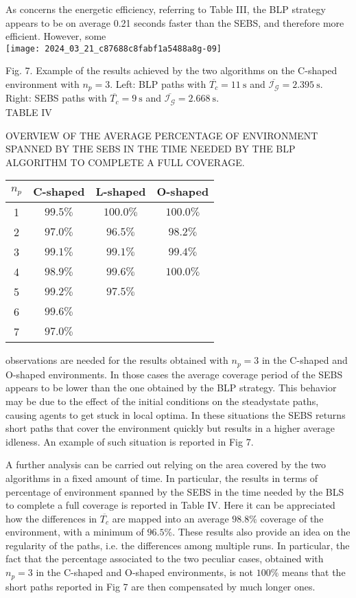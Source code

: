 \documentclass[conference]{IEEEtran}
\begin{document}
As concerns the energetic efficiency, referring to Table III, the BLP strategy appears to be on average 0.21 seconds faster than the SEBS, and therefore more efficient. However, some\\
\texttt{[image: 2024\_03\_21\_c87688c8fabf1a5488a8g-09]}

Fig. 7. Example of the results achieved by the two algorithms on the C-shaped environment with $n_{p}=3$. Left: BLP paths with $\overline{T_{c}}=11 \mathrm{~s}$ and $\overline{\mathcal{I}_{\mathcal{G}}}=2.395 \mathrm{~s}$. Right: SEBS paths with $\overline{T_{c}}=9 \mathrm{~s}$ and $\overline{\mathcal{I}_{\mathcal{G}}}=2.668 \mathrm{~s}$.\\
TABLE IV

OVERVIEW OF THE AVERAGE PERCENTAGE OF ENVIRONMENT SPANNED BY THE SEBS IN THE TIME NEEDED BY THE BLP ALGORITHM TO COMPLETE A FULL COVERAGE.

\begin{center}
\begin{tabular}{cccc}
\hline
$n_{p}$ & C-shaped & L-shaped & O-shaped \\
\hline
1 & $99.5 \%$ & $100.0 \%$ & $100.0 \%$ \\
2 & $97.0 \%$ & $96.5 \%$ & $98.2 \%$ \\
3 & $99.1 \%$ & $99.1 \%$ & $99.4 \%$ \\
4 & $98.9 \%$ & $99.6 \%$ & $100.0 \%$ \\
5 & $99.2 \%$ & $97.5 \%$ &  \\
6 & $99.6 \%$ &  &  \\
7 & $97.0 \%$ &  &  \\
\end{tabular}
\end{center}

observations are needed for the results obtained with $n_{p}=3$ in the $\mathrm{C}$-shaped and $\mathrm{O}$-shaped environments. In those cases the average coverage period of the SEBS appears to be lower than the one obtained by the BLP strategy. This behavior may be due to the effect of the initial conditions on the steadystate paths, causing agents to get stuck in local optima. In these situations the SEBS returns short paths that cover the environment quickly but results in a higher average idleness. An example of such situation is reported in Fig 7.

A further analysis can be carried out relying on the area covered by the two algorithms in a fixed amount of time. In particular, the results in terms of percentage of environment spanned by the SEBS in the time needed by the BLS to complete a full coverage is reported in Table IV. Here it can be appreciated how the differences in $\overline{T_{c}}$ are mapped into an average $98.8 \%$ coverage of the environment, with a minimum of $96.5 \%$. These results also provide an idea on the regularity of the paths, i.e. the differences among multiple runs. In particular, the fact that the percentage associated to the two peculiar cases, obtained with $n_{p}=3$ in the $\mathrm{C}$-shaped and O-shaped environments, is not $100 \%$ means that the short paths reported in Fig 7 are then compensated by much longer ones.
\end{document}
